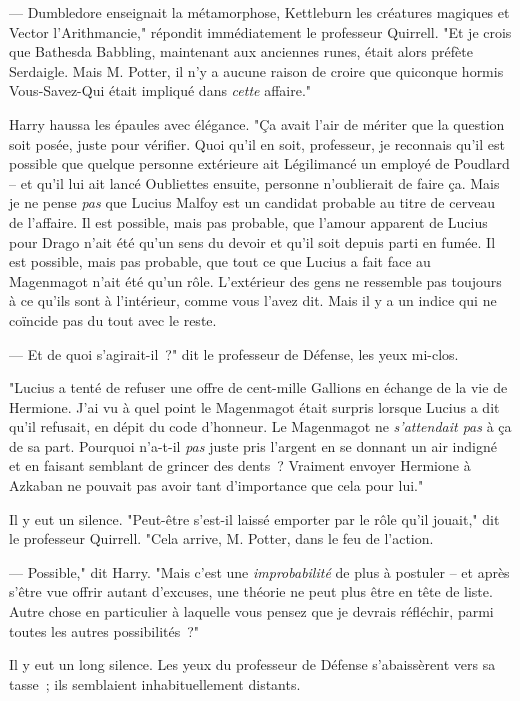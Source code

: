 --- Dumbledore enseignait la métamorphose, Kettleburn les créatures magiques et Vector l'Arithmancie," répondit immédiatement le professeur Quirrell. "Et je crois que Bathesda Babbling, maintenant aux anciennes runes, était alors préfète Serdaigle. Mais M. Potter, il n'y a aucune raison de croire que quiconque hormis Vous-Savez-Qui était impliqué dans \emph{cette} affaire."

Harry haussa les épaules avec élégance. "Ça avait l'air de mériter que la question soit posée, juste pour vérifier. Quoi qu'il en soit, professeur, je reconnais qu'il est possible que quelque personne extérieure ait Légilimancé un employé de Poudlard -- et qu'il lui ait lancé Oubliettes ensuite, personne n'oublierait de faire ça. Mais je ne pense \emph{pas} que Lucius Malfoy est un candidat probable au titre de cerveau de l'affaire. Il est possible, mais pas probable, que l'amour apparent de Lucius pour Drago n'ait été qu'un sens du devoir et qu'il soit depuis parti en fumée. Il est possible, mais pas probable, que tout ce que Lucius a fait face au Magenmagot n'ait été qu'un rôle. L'extérieur des gens ne ressemble pas toujours à ce qu'ils sont à l'intérieur, comme vous l'avez dit. Mais il y a un indice qui ne coïncide pas du tout avec le reste.

--- Et de quoi s'agirait-il~?" dit le professeur de Défense, les yeux mi-clos.

"Lucius a tenté de refuser une offre de cent-mille Gallions en échange de la vie de Hermione. J'ai vu à quel point le Magenmagot était surpris lorsque Lucius a dit qu'il refusait, en dépit du code d'honneur. Le Magenmagot ne \emph{s'attendait pas} à ça de sa part. Pourquoi n'a-t-il \emph{pas} juste pris l'argent en se donnant un air indigné et en faisant semblant de grincer des dents~? Vraiment envoyer Hermione à Azkaban ne pouvait pas avoir tant d'importance que cela pour lui."

Il y eut un silence. "Peut-être s'est-il laissé emporter par le rôle qu'il jouait," dit le professeur Quirrell. "Cela arrive, M. Potter, dans le feu de l'action.

--- Possible," dit Harry. "Mais c'est une \emph{improbabilité} de plus à postuler -- et après s'être vue offrir autant d'excuses, une théorie ne peut plus être en tête de liste. Autre chose en particulier à laquelle vous pensez que je devrais réfléchir, parmi toutes les autres possibilités~?"

Il y eut un long silence. Les yeux du professeur de Défense s'abaissèrent vers sa tasse~; ils semblaient inhabituellement distants.

